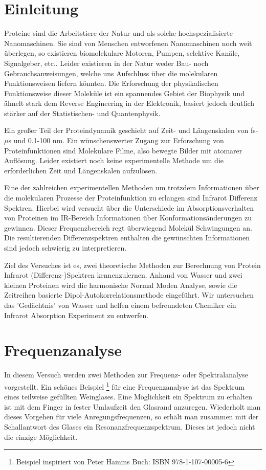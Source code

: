 \documentclass[a4paper,12pt]{article}
\begin{document}
\section*{Einleitung}
Proteine sind die Arbeitstiere der Natur und als solche hochspezialisierte Nanomaschinen. 
Sie sind von Menschen entworfenen Nanomaschinen noch weit überlegen, so existieren biomolekulare Motoren, Pumpen, selektive Kanäle, Signalgeber, etc.. 
Leider existieren in der Natur weder Bau- noch Gebrauchsanweisungen, welche uns Aufschluss über die molekularen Funktionsweisen liefern könnten. 
Die Erforschung der physikalischen Funktionsweise dieser Moleküle ist ein spannendes Gebiet der Biophysik und ähnelt stark dem Reverse Engineering 
in der Elektronik, basiert jedoch deutlich stärker auf der Statistischen- und Quantenphysik.

Ein großer Teil der Proteindynamik geschieht auf Zeit- und Längenskalen von fs-$\mu$s und 0.1-100 nm. Ein wünschenswerter Zugang zur 
Erforschung von Proteinfunktionen sind Molekulare Filme, also bewegte Bilder mit atomarer Auflösung. Leider existiert noch 
keine experimentelle Methode um die erforderlichen Zeit und Längenskalen aufzulösen.

Eine der zahlreichen experimentellen Methoden um trotzdem Informationen über die molekularen Prozesse der Proteinfunktion zu erlangen sind 
Infrarot Differenz Spektren. Hierbei wird versucht über die Unterschiede im Absorptionsverhalten von Proteinen im IR-Bereich
Informationen über Konformationsänderungen zu gewinnen. Dieser Frequenzbereich regt überwiegend Molekül Schwingungen an. Die resultierenden 
Differenzspektren enthalten die gewünschten Informationen sind jedoch schwierig zu interpretieren.

Ziel des Versuches ist es, zwei theoretische Methoden zur Berechnung von Protein Infrarot (Differenz-)Spektren kennenzulernen. Anhand von Wasser 
und zwei kleinen Proteinen wird die harmonische Normal Moden Analyse, sowie die Zeitreihen basierte Dipol-Autokorrelationsmethode eingeführt. Wir 
untersuchen das 'Gedächtnis' von Wasser und helfen einem befreundeten Chemiker ein Infrarot Absorption Experiment zu entwerfen.

\section{Frequenzanalyse} 
In diesem Versuch werden zwei Methoden zur Frequenz- oder Spektralanalyse vorgestellt. Ein schönes Beispiel \footnote{Beispiel inspiriert von Peter Hamms Buch: ISBN 978-1-107-00005-6}
für eine Frequenzanalyse ist das Spektrum eines teilweise gefüllten Weinglases. Eine Möglichkeit ein Spektrum zu erhalten ist mit dem Finger in
fester Umlaufzeit den Glasrand anzuregen. Wiederholt man dieses Vorgehen für viele Anregungsfrequenzen, so erhält man zusammen mit der Schallantwort
des Glases ein Resonanzfrequenzspektrum. Dieses ist jedoch nicht die einzige Möglichkeit. 
\end{document}
